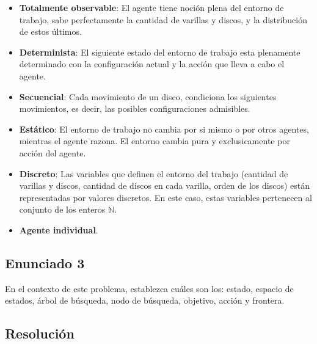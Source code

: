 \documentclass[12pt]{article}
\begin{document}
            \begin{itemize}
                \item \textbf{Totalmente observable}: El agente tiene noción plena del entorno de trabajo, sabe perfectamente la cantidad de varillas y discos, y la distribución de estos últimos.
                \item \textbf{Determinista}: El siguiente estado del entorno de trabajo esta plenamente determinado con la configuración actual y la acción que lleva a cabo el agente.
                \item \textbf{Secuencial}: Cada movimiento de un disco, condiciona los siguientes movimientos, es decir, las posibles configuraciones admisibles.
                \item \textbf{Estático}: El entorno de trabajo no cambia por si mismo o por otros agentes, mientras el agente razona. El entorno cambia pura y exclusicamente por acción del agente.
                \item \textbf{Discreto}: Las variables que definen el entorno del trabajo (cantidad de varillas y discos, cantidad de discos en cada varilla, orden de los discos) están representadas por valores discretos. En este caso, estas variables pertenecen al conjunto de los enteros $\mathbb{N}$.
                \item \textbf{Agente individual}.
            \end{itemize}
    \newpage

%

\subsection*{Enunciado 3}
        
En el contexto de este problema, establezca cuáles son los: estado, espacio de estados, árbol de búsqueda, 
nodo de búsqueda, objetivo, acción y frontera.
\subsection*{Resolución}
\vspace{0.1in}
\end{document}
